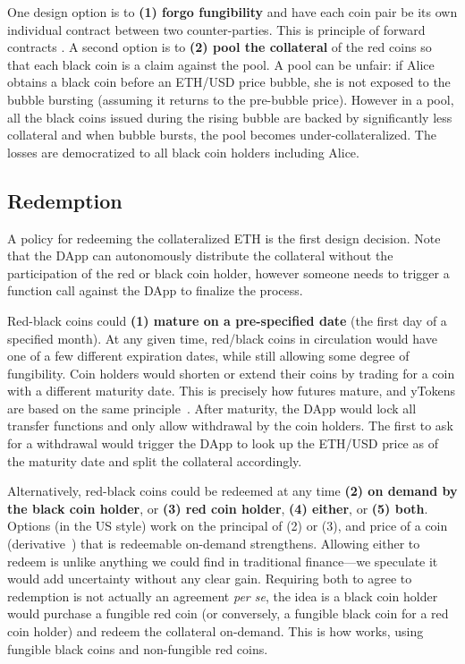 One design option is to \textbf{(1) forgo fungibility} and have each coin pair be its own individual contract between two counter-parties. This is principle of forward contracts \cite{Har03}. A second option is to \textbf{(2) pool the collateral} of the red coins so that each black coin is a claim against the pool. A pool can be unfair: if Alice obtains a black coin before an ETH/USD price bubble, she is not exposed to the bubble bursting (assuming it returns to the pre-bubble price). However in a pool, all the black coins issued during the rising bubble are backed by significantly less collateral and when bubble bursts, the pool becomes under-collateralized. The losses are democratized to all black coin holders including Alice. 


\subsection{Redemption}
\label{sec:maturity}

A policy for redeeming the collateralized ETH is the first design decision. Note that the DApp can autonomously distribute the collateral without the participation of the red or black coin holder, however someone needs to trigger a function call against the DApp to finalize the process.

 Red-black coins could \textbf{(1) mature on a pre-specified date} (\eg the first day of a specified month). At any given time, red/black coins in circulation would have one of a few different expiration dates, while still allowing some degree of fungibility. Coin holders would shorten or extend their coins by trading for a coin with a different maturity date. This is precisely how futures \cite{Har03} mature, and yTokens are based on the same principle~\cite{RoNi20}. After maturity, the DApp would lock all transfer functions and only allow withdrawal by the coin holders. The first to ask for a withdrawal would trigger the DApp to look up the ETH/USD price as of the maturity date and split the collateral accordingly. 

Alternatively, red-black coins could be redeemed at any time \textbf{(2) on demand by the black coin holder}, or \textbf{(3) red coin holder}, \textbf{(4) either}, or \textbf{(5) both}. Options (in the US style) \cite{Har03} work on the principal of (2) or (3), and price of a coin (\cf derivative~\cite{Sey09}) that is redeemable on-demand strengthens. Allowing either to redeem is unlike anything we could find in traditional finance---we speculate it would add uncertainty without any clear gain. Requiring both to agree to redemption is not actually an agreement \textit{per se}, the idea is a black coin holder would purchase a fungible red coin (or conversely, a fungible black coin for a red coin holder) and redeem the collateral on-demand. This is how \dai works, using fungible black coins and non-fungible red coins. 


